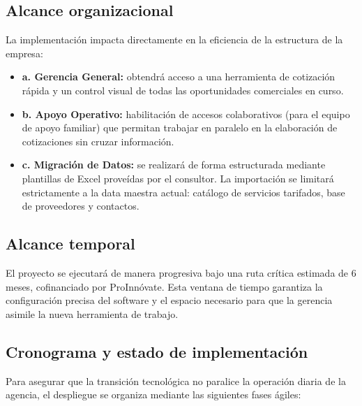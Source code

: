 \subsection{Alcance organizacional}
\begin{indentedsubsection}
La implementación impacta directamente en la eficiencia de la estructura de la empresa:

\begin{itemize}
    \item \textbf{a. Gerencia General:} obtendrá acceso a una herramienta de cotización rápida y un control visual de todas las oportunidades comerciales en curso.
    \item \textbf{b. Apoyo Operativo:} habilitación de accesos colaborativos (para el equipo de apoyo familiar) que permitan trabajar en paralelo en la elaboración de cotizaciones sin cruzar información.
    \item \textbf{c. Migración de Datos:} se realizará de forma estructurada mediante plantillas de Excel proveídas por el consultor. La importación se limitará estrictamente a la data maestra actual: catálogo de servicios tarifados, base de proveedores y contactos.
\end{itemize}
\end{indentedsubsection}

\subsection{Alcance temporal}
\begin{indentedsubsection}
El proyecto se ejecutará de manera progresiva bajo una ruta crítica estimada de 6 meses, cofinanciado por ProInnóvate. Esta ventana de tiempo garantiza la configuración precisa del software y el espacio necesario para que la gerencia asimile la nueva herramienta de trabajo.
\end{indentedsubsection}

\subsection{Cronograma y estado de implementación}
\begin{indentedsubsection}
Para asegurar que la transición tecnológica no paralice la operación diaria de la agencia, el despliegue se organiza mediante las siguientes fases ágiles:
\end{indentedsubsection}

